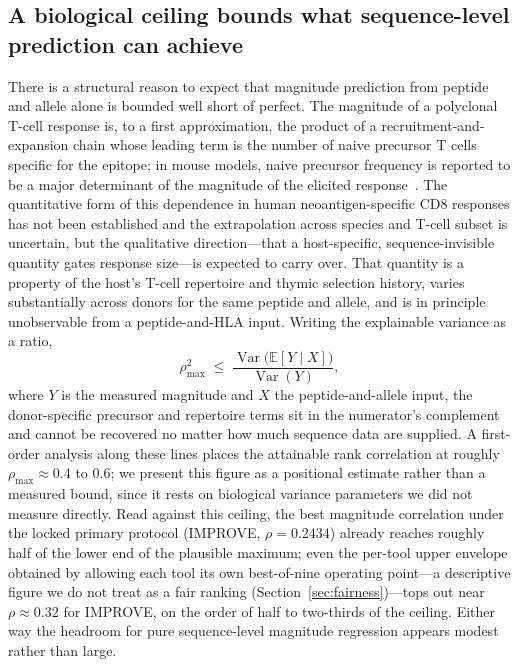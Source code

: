 \subsection{A biological ceiling bounds what sequence-level prediction can achieve}
\label{sec:disc-ceiling}

There is a structural reason to expect that magnitude prediction from peptide and
allele alone is bounded well short of perfect. The magnitude of a polyclonal
T-cell response is, to a first approximation, the product of a recruitment-and-
expansion chain whose leading term is the number of naive precursor T cells
specific for the epitope; in mouse models, naive precursor frequency is reported
to be a major determinant of the magnitude of the elicited
response~\cite{Jenkins2012,Moon2007}. The quantitative form of this dependence in
human neoantigen-specific CD8 responses has not been established and the
extrapolation across species and T-cell subset is uncertain, but the qualitative
direction---that a host-specific, sequence-invisible quantity gates response
size---is expected to carry over. That quantity is a property of the
host's T-cell repertoire and thymic selection history, varies substantially
across donors for the same peptide and allele, and is in principle unobservable
from a peptide-and-HLA input. Writing the explainable variance as a ratio,
\begin{equation}
  \rho_{\max}^2 \;\le\; \frac{\operatorname{Var}\!\big(\mathbb{E}[Y \mid X]\big)}
                              {\operatorname{Var}(Y)},
  \label{eq:ceiling}
\end{equation}
where $Y$ is the measured magnitude and $X$ the peptide-and-allele input, the
donor-specific precursor and repertoire terms sit in the numerator's complement
and cannot be recovered no matter how much sequence data are supplied. A
first-order analysis along these lines places the attainable rank correlation at
roughly $\rho_{\max}\approx 0.4$ to $0.6$; we present this figure as a positional
estimate rather than a measured bound, since it rests on biological variance
parameters we did not measure directly. Read against this ceiling, the best
magnitude correlation under the locked primary protocol (IMPROVE,
$\rho = 0.2434$) already reaches roughly half of the lower end of the plausible
maximum; even the per-tool upper envelope obtained by allowing each tool its own
best-of-nine operating point---a descriptive figure we do not treat as a fair
ranking (Section~\ref{sec:fairness})---tops out near $\rho\approx 0.32$ for IMPROVE,
on the order of half to two-thirds of the ceiling. Either way the headroom for
pure sequence-level magnitude regression appears modest rather than large.

